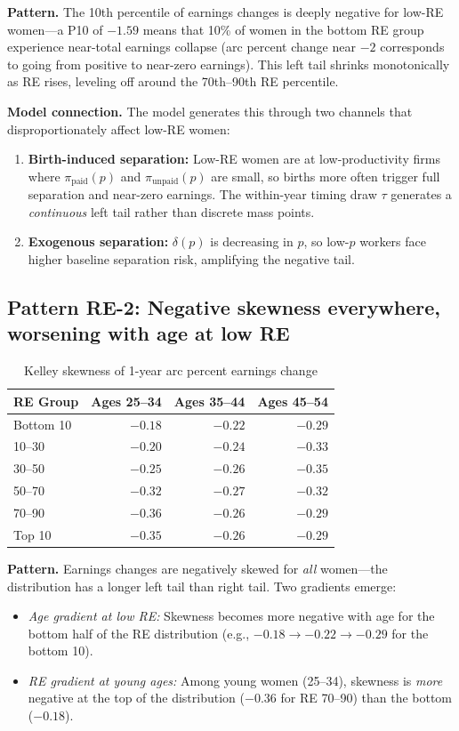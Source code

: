 \documentclass[11pt]{article}
\begin{document}
\noindent\textbf{Pattern.} The 10th percentile of earnings changes is deeply negative for low-RE women---a P10 of $-1.59$ means that 10\% of women in the bottom RE group experience near-total earnings collapse (arc percent change near $-2$ corresponds to going from positive to near-zero earnings). This left tail shrinks monotonically as RE rises, leveling off around the 70th--90th RE percentile.

\medskip\noindent\textbf{Model connection.} The model generates this through two channels that disproportionately affect low-RE women:
\begin{enumerate}[nosep]
  \item \textbf{Birth-induced separation:} Low-RE women are at low-productivity firms where $\pi_{\text{paid}}(p)$ and $\pi_{\text{unpaid}}(p)$ are small, so births more often trigger full separation and near-zero earnings. The within-year timing draw $\tau$ generates a \emph{continuous} left tail rather than discrete mass points.
  \item \textbf{Exogenous separation:} $\delta(p)$ is decreasing in $p$, so low-$p$ workers face higher baseline separation risk, amplifying the negative tail.
\end{enumerate}

\subsection{Pattern RE-2: Negative skewness everywhere, worsening with age at low RE}

\begin{table}[h]\centering
\caption{Kelley skewness of 1-year arc percent earnings change}
\begin{tabular}{lrrr}
\toprule
RE Group & Ages 25--34 & Ages 35--44 & Ages 45--54 \\
\midrule
Bottom 10 & $-0.18$ & $-0.22$ & $-0.29$ \\
10--30    & $-0.20$ & $-0.24$ & $-0.33$ \\
30--50    & $-0.25$ & $-0.26$ & $-0.35$ \\
50--70    & $-0.32$ & $-0.27$ & $-0.32$ \\
70--90    & $-0.36$ & $-0.26$ & $-0.29$ \\
Top 10    & $-0.35$ & $-0.26$ & $-0.29$ \\
\bottomrule
\end{tabular}
\end{table}

\noindent\textbf{Pattern.} Earnings changes are negatively skewed for \emph{all} women---the distribution has a longer left tail than right tail. Two gradients emerge:
\begin{itemize}[nosep]
  \item \emph{Age gradient at low RE:} Skewness becomes more negative with age for the bottom half of the RE distribution (e.g., $-0.18 \to -0.22 \to -0.29$ for the bottom 10).
  \item \emph{RE gradient at young ages:} Among young women (25--34), skewness is \emph{more} negative at the top of the distribution ($-0.36$ for RE 70--90) than the bottom ($-0.18$).
\end{itemize}
\end{document}
